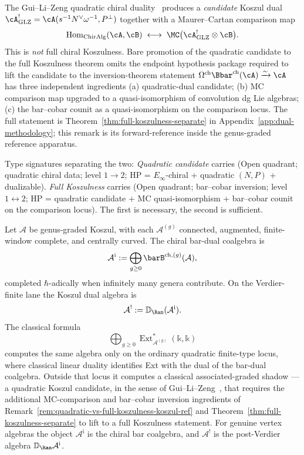 \begin{remark}
\label{rem:quadratic-vs-full-koszulness-koszul-ref}
The Gui--Li--Zeng quadratic chiral duality~\cite{GLZ22} produces a
\emph{candidate} Koszul dual $\cA^!_{\mathrm{GLZ}} = \cA(s^{-1}N^\vee
\omega^{-1}, P^\perp)$ together with a Maurer--Cartan comparison map
\[
\operatorname{Hom}_{\mathrm{ChirAlg}}(\cA, \cB)
\;\longleftrightarrow\;
\MC\bigl(\cA^!_{\mathrm{GLZ}} \otimes \cB\bigr).
\]
This is \emph{not} full chiral Koszulness. Bare promotion of the
quadratic candidate to the full Koszulness theorem omits the endpoint
hypothesis package required to lift the candidate to the
inversion-theorem statement
$\Omega^{\mathrm{ch}}\Bbar^{\mathrm{ch}}(\cA) \xrightarrow{\sim} \cA$
has three independent ingredients (a) quadratic-dual candidate;
(b) MC comparison map upgraded to a quasi-isomorphism of convolution
dg Lie algebras; (c) the bar--cobar counit as a quasi-isomorphism on the
comparison locus. The full statement is
Theorem~\ref{thm:full-koszulness-separate} in
Appendix~\ref{app:dual-methodology}; this remark is its
forward-reference inside the genus-graded reference apparatus.

Type signatures separating the two:
\emph{Quadratic candidate} carries (Open quadrant; quadratic chiral
data; level $1\!\rightarrow\!2$; HP = $E_\infty$-chiral + quadratic
$(N,P)$ + dualizable). \emph{Full Koszulness} carries (Open quadrant;
bar--cobar inversion; level $1\!\leftrightarrow\!2$; HP = quadratic
candidate + MC quasi-isomorphism + bar--cobar counit on the comparison
locus). The first is necessary, the second is sufficient.
\end{remark}

\begin{theorem}
\label{thm:genus-graded-koszul-duality-appendix}
Let $\mathcal{A}$ be genus-graded Koszul, with each
$\mathcal{A}^{(g)}$ connected, augmented, finite-window complete, and
centrally curved. The chiral bar-dual coalgebra is
\[
\mathcal{A}^{\mathrm i}:=
\bigoplus_{g\geq 0}\barB^{\mathrm{ch},(g)}(\mathcal{A}),
\]
completed $\hbar$-adically when infinitely many genera contribute.
On the Verdier-finite lane the Koszul dual algebra is
\[
\mathcal{A}^{!}:=\mathbb{D}_{\Ran}(\mathcal{A}^{\mathrm i}).
\]
The classical formula
\[
\bigoplus_{g\geq 0}
\operatorname{Ext}^{*}_{\mathcal{A}^{(g)}}(\mathbb{k},\mathbb{k})
\]
computes the same algebra only on the ordinary quadratic finite-type
locus, where classical linear duality identifies Ext with the dual of
the bar-dual coalgebra. Outside that locus it computes a classical
associated-graded shadow — a quadratic Koszul candidate, in the
sense of Gui--Li--Zeng~\cite{GLZ22}, that requires the additional
MC-comparison and bar--cobar inversion ingredients of
Remark~\ref{rem:quadratic-vs-full-koszulness-koszul-ref} and
Theorem~\ref{thm:full-koszulness-separate} to lift to a full
Koszulness statement. For genuine vertex algebras the object
$\mathcal{A}^{\mathrm i}$ is the chiral bar coalgebra, and
$\mathcal{A}^{!}$ is the post-Verdier algebra
$\mathbb{D}_{\Ran}\mathcal{A}^{\mathrm i}$.
\end{theorem}

